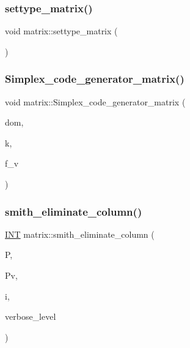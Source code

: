 \subsubsection{\texorpdfstring{settype\+\_\+matrix()}{settype\_matrix()}}
{\footnotesize\ttfamily void matrix\+::settype\+\_\+matrix (\begin{DoxyParamCaption}{ }\end{DoxyParamCaption})}

\mbox{\label{classmatrix_a8183959565956f14466fe9d366c2c195}} 
\subsubsection{\texorpdfstring{Simplex\+\_\+code\+\_\+generator\+\_\+matrix()}{Simplex\_code\_generator\_matrix()}}
{\footnotesize\ttfamily void matrix\+::\+Simplex\+\_\+code\+\_\+generator\+\_\+matrix (\begin{DoxyParamCaption}\item[{\mbox{\hyperlink{classdomain}{domain}} $\ast$}]{dom,  }\item[{\mbox{\hyperlink{galois_8h_a09fddde158a3a20bd2dcadb609de11dc}{I\+NT}}}]{k,  }\item[{\mbox{\hyperlink{galois_8h_a09fddde158a3a20bd2dcadb609de11dc}{I\+NT}}}]{f\+\_\+v }\end{DoxyParamCaption})}

\mbox{\label{classmatrix_ab1f7e8511834e7782ef09f59d8281c74}} 
\subsubsection{\texorpdfstring{smith\+\_\+eliminate\+\_\+column()}{smith\_eliminate\_column()}}
{\footnotesize\ttfamily \mbox{\hyperlink{galois_8h_a09fddde158a3a20bd2dcadb609de11dc}{I\+NT}} matrix\+::smith\+\_\+eliminate\+\_\+column (\begin{DoxyParamCaption}\item[{\mbox{\hyperlink{classmatrix}{matrix}} \&}]{P,  }\item[{\mbox{\hyperlink{classmatrix}{matrix}} \&}]{Pv,  }\item[{\mbox{\hyperlink{galois_8h_a09fddde158a3a20bd2dcadb609de11dc}{I\+NT}}}]{i,  }\item[{\mbox{\hyperlink{galois_8h_a09fddde158a3a20bd2dcadb609de11dc}{I\+NT}}}]{verbose\+\_\+level }\end{DoxyParamCaption})}

